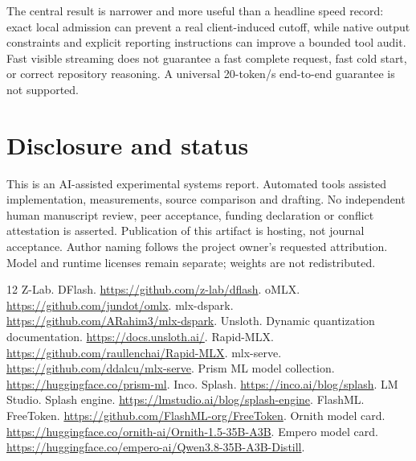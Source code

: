 \documentclass[11pt]{article}
\begin{document}
The central result is narrower and more useful than a headline speed record: exact local admission can prevent a real client-induced cutoff, while native output constraints and explicit reporting instructions can improve a bounded tool audit. Fast visible streaming does not guarantee a fast complete request, fast cold start, or correct repository reasoning. A universal 20-token/s end-to-end guarantee is not supported.

\section*{Disclosure and status}
This is an AI-assisted experimental systems report. Automated tools assisted implementation, measurements, source comparison and drafting. No independent human manuscript review, peer acceptance, funding declaration or conflict attestation is asserted. Publication of this artifact is hosting, not journal acceptance. Author naming follows the project owner's requested attribution. Model and runtime licenses remain separate; weights are not redistributed.

\begin{thebibliography}{12}
 Z-Lab. DFlash. \url{https://github.com/z-lab/dflash}.
 oMLX. \url{https://github.com/jundot/omlx}.
 mlx-dspark. \url{https://github.com/ARahim3/mlx-dspark}.
 Unsloth. Dynamic quantization documentation. \url{https://docs.unsloth.ai/}.
 Rapid-MLX. \url{https://github.com/raullenchai/Rapid-MLX}.
 mlx-serve. \url{https://github.com/ddalcu/mlx-serve}.
 Prism ML model collection. \url{https://huggingface.co/prism-ml}.
 Inco. Splash. \url{https://inco.ai/blog/splash}.
 LM Studio. Splash engine. \url{https://lmstudio.ai/blog/splash-engine}.
 FlashML. FreeToken. \url{https://github.com/FlashML-org/FreeToken}.
 Ornith model card. \url{https://huggingface.co/ornith-ai/Ornith-1.5-35B-A3B}.
 Empero model card. \url{https://huggingface.co/empero-ai/Qwen3.8-35B-A3B-Distill}.
\end{thebibliography}
\end{document}
